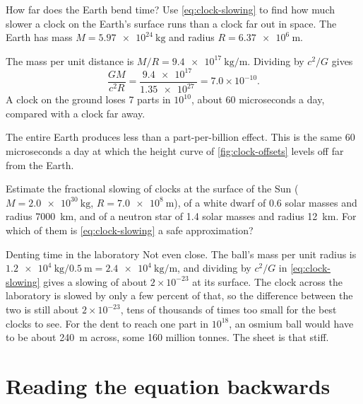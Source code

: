 \begin{example}[label=ex:earth-dent]{How far does the Earth bend time?}
Use \cref{eq:clock-slowing} to find how much slower a clock on the Earth's
surface runs than a clock far out in space. The Earth has mass
$M = \SI{5.97e24}{\kilogram}$ and radius $R = \SI{6.37e6}{\metre}$.

\solution The mass per unit distance is
$M/R = \SI{9.4e17}{\kilogram\per\metre}$. Dividing by $c^{2}/G$ gives
\begin{equation*}
  \frac{GM}{c^{2}R} = \frac{\SI{9.4e17}{}}{\SI{1.35e27}{}} = 7.0\times10^{-10}.
\end{equation*}
A clock on the ground loses 7 parts in $10^{10}$, about 60 microseconds a day,
compared with a clock far away.

\discussion The entire Earth produces less than a part-per-billion effect.
This is the same 60 microseconds a day at which the height curve of
\cref{fig:clock-offsets} levels off far from the Earth.
\end{example}

\begin{checkpoint}[label=chk:sun-ns]
Estimate the fractional slowing of clocks at the surface of the Sun
($M = \SI{2.0e30}{\kilogram}$, $R = \SI{7.0e8}{\metre}$), of a white dwarf of
0.6 solar masses and radius \SI{7000}{\kilo\metre}, and of a neutron star of
1.4 solar masses and radius \SI{12}{\kilo\metre}. For which of them is
\cref{eq:clock-slowing} a safe approximation?
\end{checkpoint}

\begin{revisited}{Denting time in the laboratory}
Not even close. The ball's mass per unit radius is
$\SI{1.2e4}{\kilogram}/\SI{0.5}{\metre} = \SI{2.4e4}{\kilogram\per\metre}$,
and dividing by $c^{2}/G$ in \cref{eq:clock-slowing} gives a slowing of about
$2\times10^{-23}$ at its surface. The clock across the laboratory is slowed by
only a few percent of that, so the difference between the two is still about
$2\times10^{-23}$, tens of thousands of times too small for the best clocks to
see. For the dent to reach one part in $10^{18}$, an osmium ball would have to
be about \SI{240}{\metre} across, some 160 million tonnes. The sheet is that
stiff.
\end{revisited}

\section{Reading the equation backwards}\label{sec:backwards-intro}

